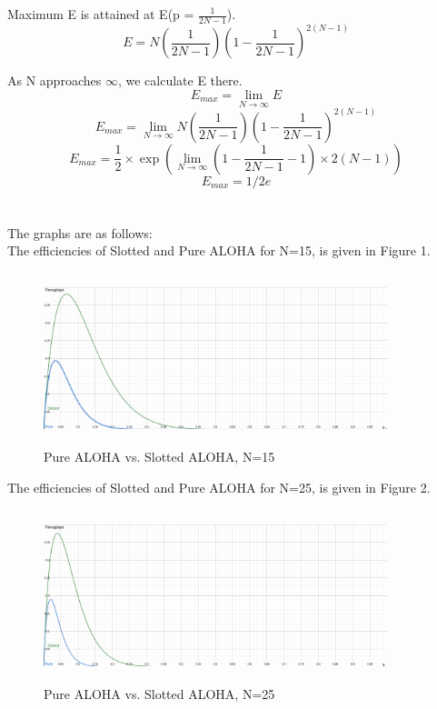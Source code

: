 \documentclass[12pt]{article}
\begin{document}
Maximum E is attained at E(p = $\frac{1}{2N-1}$).
\begin{equation*}
    E = N(\frac{1}{2N-1})(1 - \frac{1}{2N-1})^{2(N-1)}
\end{equation*}

As N approaches $\infty$, we calculate E there. 
\begin{equation*}
    E_{max} = \lim_{N \to \infty} E
\end{equation*}
\begin{equation*}
    E_{max} = \lim_{N \to \infty} N(\frac{1}{2N-1})(1 - \frac{1}{2N-1})^{2(N-1)}
\end{equation*}
\begin{equation*}
    E_{max} = \frac{1}{2} \times \exp (\lim_{N \to \infty}(1 - \frac{1}{2N-1} - 1) \times 2(N-1))
\end{equation*}
\begin{equation*}
    E_{max} = 1/2e
\end{equation*}

\section{}
The graphs are as follows: \\

The efficiencies of Slotted and Pure ALOHA for N=15, is given in Figure 1.
\begin{figure}
    \centering
    \includegraphics[width=10cm, height=5cm]{N_15.png}
    \caption{Pure ALOHA vs. Slotted ALOHA, N=15}
\end{figure}

The efficiencies of Slotted and Pure ALOHA for N=25, is given in Figure 2.
\begin{figure}
    \centering
    \includegraphics[width=10cm, height=5cm]{N_25.png}
    \caption{Pure ALOHA vs. Slotted ALOHA, N=25}
\end{figure}
\end{document}
